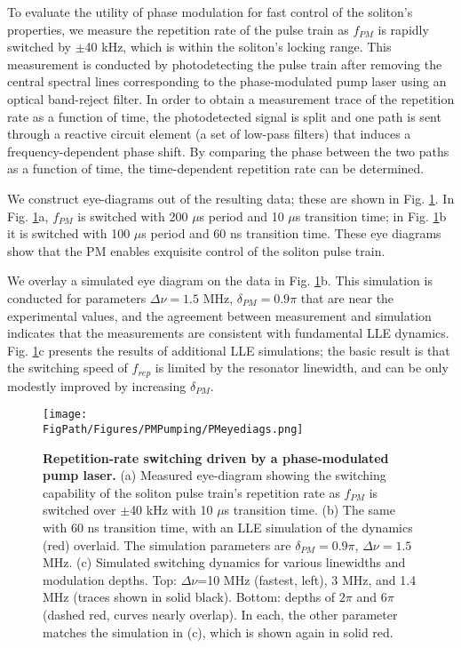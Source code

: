 To evaluate the utility of phase modulation for fast control of the soliton's properties, we measure the repetition rate of the pulse train as $f_{PM}$ is rapidly switched by $\pm$40 kHz, which is within the soliton's locking range. This measurement is conducted by photodetecting the pulse train after removing the central spectral lines corresponding to the phase-modulated pump laser using an optical band-reject filter. In order to obtain a measurement trace of the repetition rate as a function of time, the photodetected signal is split and one path is sent through a reactive circuit element (a set of low-pass filters) that induces a frequency-dependent phase shift. By comparing the phase between the two paths as a function of time, the time-dependent repetition rate can be determined.

We construct eye-diagrams out of the resulting data; these are shown in Fig. \ref{fig:PMeyediags}. In Fig. \ref{fig:PMeyediags}a, $f_{PM}$ is switched with 200 $\mu$s period and 10 $\mu$s transition time; in Fig. \ref{fig:PMeyediags}b it is switched with 100 $\mu$s period and 60 ns transition time. These eye diagrams show that the PM enables exquisite control of the soliton pulse train.

We overlay a simulated eye diagram on the data in Fig. \ref{fig:PMeyediags}b. This simulation is conducted for parameters $\Delta\nu=1.5$ MHz, $\delta_{PM}=0.9\pi$ that are near the experimental values, and the agreement between measurement and simulation indicates that the measurements are consistent with fundamental LLE dynamics. Fig. \ref{fig:PMeyediags}c presents the results of additional LLE simulations; the basic result is that the switching speed of $f_{rep}$ is limited by the resonator linewidth, and can be only modestly improved by increasing $\delta_{PM}$. 

\begin{figure}[htpb]
	\begin{center}
		\texttt{[image: \\FigPath/Figures/PMPumping/PMeyediags.png]}
	\end{center}
	\caption[Repetition-rate switching driven by a phase-modulated pump laser]{\textbf{Repetition-rate switching driven by a phase-modulated pump laser.} (a) Measured eye-diagram showing the switching capability of the soliton pulse train's repetition rate as $f_{PM}$ is switched over $\pm$40 kHz with 10 $\mu$s transition time. (b) The same with 60 ns transition time, with an LLE simulation of the dynamics (red) overlaid. The simulation parameters are $\delta_{PM}=0.9\pi$, $\Delta\nu=1.5$ MHz. (c) Simulated switching dynamics for various linewidths and modulation depths. Top: $\Delta\nu$=10 MHz (fastest, left), 3 MHz, and 1.4 MHz (traces shown in solid black). Bottom: depths of $2\pi$ and $6\pi$ (dashed red, curves nearly overlap). In each, the other parameter matches the simulation in (c), which is shown again in solid red. }
	\label{fig:PMeyediags}
\end{figure} 

